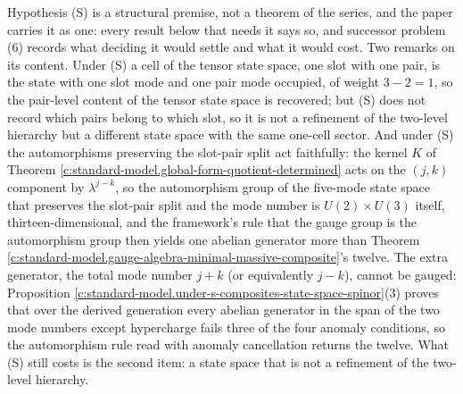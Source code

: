 \documentclass[11pt]{article}
\theoremstyle{definition}
\theoremstyle{plain}
\begin{document}
Hypothesis (S) is a structural premise, not a theorem of the series, and the paper carries it as one: every result below that needs it says so, and successor problem (6) records what deciding it would settle and what it would cost. Two remarks on its content. Under (S) a cell of the tensor state space, one slot with one pair, is the state with one slot mode and one pair mode occupied, of weight $3 - 2 = 1$, so the pair-level content of the tensor state space is recovered; but (S) does not record which pairs belong to which slot, so it is not a refinement of the two-level hierarchy but a different state space with the same one-cell sector. And under (S) the automorphisms preserving the slot-pair split act faithfully: the kernel $K$ of Theorem \ref{c:standard-model.global-form-quotient-determined} acts on the $(j, k)$ component by $\lambda^{j - k}$, so the automorphism group of the five-mode state space that preserves the slot-pair split and the mode number is $U(2) \times U(3)$ itself, thirteen-dimensional, and the framework's rule that the gauge group is the automorphism group then yields one abelian generator more than Theorem \ref{c:standard-model.gauge-algebra-minimal-massive-composite}'s twelve. The extra generator, the total mode number $j + k$ (or equivalently $j - k$), cannot be gauged: Proposition \ref{c:standard-model.under-s-composites-state-space-spinor}(3) proves that over the derived generation every abelian generator in the span of the two mode numbers except hypercharge fails three of the four anomaly conditions, so the automorphism rule read with anomaly cancellation returns the twelve. What (S) still costs is the second item: a state space that is not a refinement of the two-level hierarchy.
\end{document}
